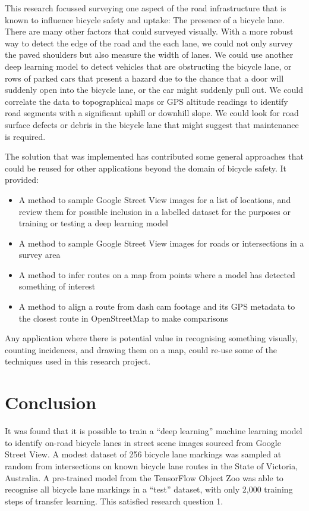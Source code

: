 \documentclass[11pt,twoside]{report}
\begin{document}
This research focussed surveying one aspect of the road infrastructure that is known to influence bicycle safety and uptake:  The presence of a bicycle lane.  There are many other factors that could surveyed visually.  With a more robust way to detect the edge of the road and the each lane, we could not only survey the paved shoulders but also measure the width of lanes.  We could use another deep learning model to detect vehicles that are obstructing the bicycle lane, or rows of parked cars that present a hazard due to the chance that a door will suddenly open into the bicycle lane, or the car might suddenly pull out.  We could correlate the data to topographical maps or GPS altitude readings to identify road segments with a significant uphill or downhill slope.  We could look for road surface defects or debris in the bicycle lane that might suggest that maintenance is required.

The solution that was implemented has contributed some general approaches that could be reused for other applications beyond the domain of bicycle safety.  It provided:

\begin{itemize}
\item{A method to sample Google Street View images for a list of locations, and review them for possible inclusion in a labelled dataset for the purposes or training or testing a deep learning model}
\item{A method to sample Google Street View images for roads or intersections in a survey area}
\item{A method to infer routes on a map from points where a model has detected something of interest}
\item{A method to align a route from dash cam footage and its GPS metadata to the closest route in OpenStreetMap to make comparisons}
\end{itemize}

Any application where there is potential value in recognising something visually, counting incidences, and drawing them on a map, could re-use some of the techniques used in this research project.


\chapter{Conclusion}
\label{conclusion}

It was found that it is possible to train a ``deep learning'' machine learning model to identify on-road bicycle lanes in street scene images sourced from Google Street View.  A modest dataset of 256 bicycle lane markings was sampled at random from intersections on known bicycle lane routes in the State of Victoria, Australia.  A pre-trained model from the TensorFlow Object Zoo was able to recognise all bicycle lane markings in a ``test'' dataset, with only 2,000 training steps of transfer learning.  This satisfied research question 1.
\end{document}

